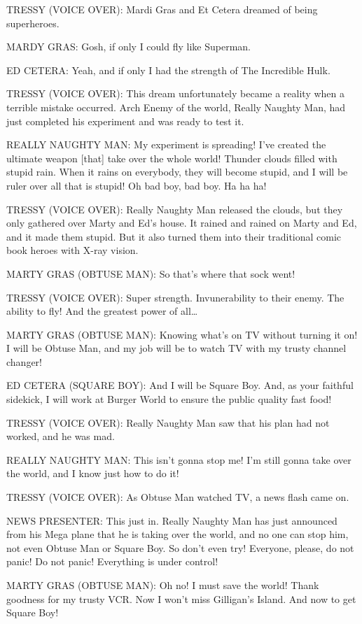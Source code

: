 TRESSY (VOICE OVER):
Mardi Gras and Et Cetera dreamed of being superheroes.

MARDY GRAS:
Gosh, if only I could fly like Superman.

ED CETERA:
Yeah, and if only I had the strength of The Incredible Hulk.

TRESSY (VOICE OVER):
This dream unfortunately became a reality when a terrible mistake occurred.
Arch Enemy of the world, Really Naughty Man, had just completed his experiment and was ready to test it.

REALLY NAUGHTY MAN:
My experiment is spreading!
I've created the ultimate weapon [that] take over the whole world!
Thunder clouds filled with stupid rain.
When it rains on everybody, they will become stupid, and I will be ruler over all that is stupid!
Oh bad boy, bad boy.
Ha ha ha!

TRESSY (VOICE OVER):
Really Naughty Man released the clouds, but they only gathered over Marty and Ed's house.
It rained and rained on Marty and Ed, and it made them stupid.
But it also turned them into their traditional comic book heroes with X-ray vision.

MARTY GRAS (OBTUSE MAN):
So that's where that sock went!

TRESSY (VOICE OVER):
Super strength.
Invunerability to their enemy.
The ability to fly!
And the greatest power of all\dots

MARTY GRAS (OBTUSE MAN):
Knowing what's on TV without turning it on!
I will be Obtuse Man, and my job will be to watch TV with my trusty channel changer!

ED CETERA (SQUARE BOY):
And I will be Square Boy.
And, as your faithful sidekick, I will work at Burger World to ensure the public quality fast food!

TRESSY (VOICE OVER):
Really Naughty Man saw that his plan had not worked, and he was mad.

REALLY NAUGHTY MAN:
This isn't gonna stop me!
I'm still gonna take over the world, and I know just how to do it!

TRESSY (VOICE OVER):
As Obtuse Man watched TV, a news flash came on.

NEWS PRESENTER:
This just in.
Really Naughty Man has just announced from his Mega plane that he is taking over the world, and no one can stop him, not even Obtuse Man or Square Boy.
So don't even try!
Everyone, please, do not panic!
Do not panic!
Everything is under control!

MARTY GRAS (OBTUSE MAN):
Oh no!
I must save the world!
Thank goodness for my trusty VCR.
Now I won't miss Gilligan's Island.
And now to get Square Boy!

